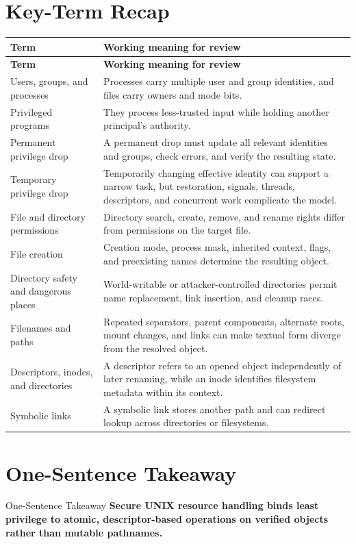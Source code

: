 \documentclass[11pt,letterpaper]{article}
\begin{document}
\section{Key-Term Recap}
\begin{longtable}{>{\raggedright\arraybackslash}p{}p{}}
\toprule
\textbf{Term} & \textbf{Working meaning for review} \\
\midrule
\endfirsthead
\toprule
\textbf{Term} & \textbf{Working meaning for review} \\
\midrule
\endhead
Users, groups, and processes & Processes carry multiple user and group identities, and files carry owners and mode bits. \\
Privileged programs & They process less-trusted input while holding another principal's authority. \\
Permanent privilege drop & A permanent drop must update all relevant identities and groups, check errors, and verify the resulting state. \\
Temporary privilege drop & Temporarily changing effective identity can support a narrow task, but restoration, signals, threads, descriptors, and concurrent work complicate the model. \\
File and directory permissions & Directory search, create, remove, and rename rights differ from permissions on the target file. \\
File creation & Creation mode, process mask, inherited context, flags, and preexisting names determine the resulting object. \\
Directory safety and dangerous places & World-writable or attacker-controlled directories permit name replacement, link insertion, and cleanup races. \\
Filenames and paths & Repeated separators, parent components, alternate roots, mount changes, and links can make textual form diverge from the resolved object. \\
Descriptors, inodes, and directories & A descriptor refers to an opened object independently of later renaming, while an inode identifies filesystem metadata within its context. \\
Symbolic links & A symbolic link stores another path and can redirect lookup across directories or filesystems. \\
\bottomrule
\end{longtable}
\section{One-Sentence Takeaway}
\begin{CornellExamBox}{One-Sentence Takeaway}
\textbf{Secure UNIX resource handling binds least privilege to atomic, descriptor-based operations on verified objects rather than mutable pathnames.}
\end{CornellExamBox}
\end{document}

